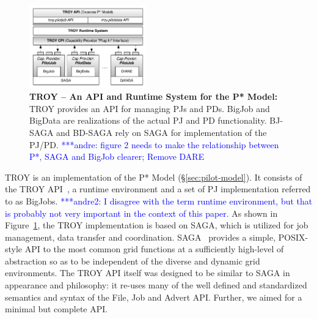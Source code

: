 \documentclass[conference,final]{IEEEtran}
\newcommand{\jhanote}[1]{ {\textcolor{red} { ***shantenu: #1 }}}
\newcommand{\alnote}[1]{ {\textcolor{blue} { ***andre: #1 }}}
\newcommand{\amnote}[1]{ {\textcolor{blue} { ***andre2: #1 }}}
\newcommand{\msnote}[1]{ {\textcolor{cyan} { ***mark: #1 }}}
\newcommand{\alnote}[1]{}
\newcommand{\amnote}[1]{}
\newcommand{\jhanote}[1]{}
\newcommand{\msnote}[1]{}
\begin{document}


\begin{figure}[t]
	\centering
		\includegraphics[width=0.45\textwidth]{figures/TROY_arch.pdf}
	\caption{\textbf{TROY -- An API and Runtime System for the P* Model:}  TROY 
	provides an API for managing PJs and PDs. BigJob and BigData are 
	realizations of the actual PJ and PD functionality. BJ-SAGA and BD-SAGA 
	rely on SAGA for implementation of the PJ/PD.\alnote{figure 2 needs to 
	make the relationship between P*, SAGA and BigJob clearer; Remove DARE
	}
	}
	\label{fig:figures_pstar_troy}
\end{figure}

TROY is an implementation of the P* Model (\S\ref{sec:pilot-model}). It
consists of the TROY API~\cite{troy}, a runtime environment and a set of PJ
implementation referred to as BigJobs. \amnote{I disagree with the term
runtime environment, but that is probably not very important in the context of
this paper.} As shown in Figure~\ref{fig:figures_pstar_troy}, the TROY
implementation is based on SAGA, which is utilized for job management, data
transfer and coordination. SAGA~\cite{saga_url,saga_gfd90} provides a simple,
POSIX-style API to the most common grid functions at a sufficiently high-level
of abstraction so as to be independent of the diverse and dynamic grid
environments. The TROY API itself was designed to be similar to SAGA in
appearance and philosophy: it re-uses many of the well defined and
standardized semantics and syntax of the File, Job and Advert API. Further, we
aimed for a minimal but complete API.%
\end{document}
